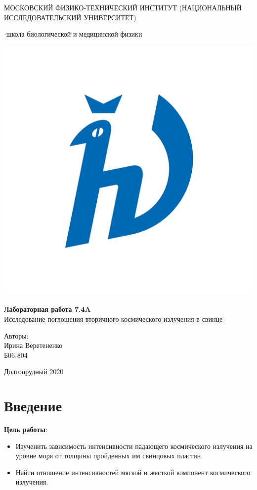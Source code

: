 \documentclass[a4paper,12pt]{article} %
\begin{document}
\begin{titlepage}
\begin{center}
    {\large МОСКОВСКИЙ ФИЗИКО-ТЕХНИЧЕСКИЙ ИНСТИТУТ (НАЦИОНАЛЬНЫЙ ИССЛЕДОВАТЕЛЬСКИЙ УНИВЕРСИТЕТ)}
\end{center}
\begin{center}
    {-школа биологической и медицинской физики}
\end{center}


    \vspace{3.5cm}

\begin{center}
    \includegraphics[width=0.4\linewidth]{hv_full.png}
\end{center}
\vspace{0.1cm}
{\huge
\begin{center}
    {\bf Лабораторная работа 7.4A}\\
    Исследование поглощения вторичного космического излучения в свинце
\end{center}
}
\vspace{2cm}
\begin{flushright}
{\LARGE Авторы:\\ Ирина Веретененко \\
\vspace{0.2cm}
Б06-804}
\end{flushright}
\vspace{3.5cm}
\begin{center}
    Долгопрудный 2020
\end{center}
\end{titlepage}

\newpage

\section{Введение}

\textbf{Цель работы}:
\begin{itemize}
    \item Изученить зависимость интенсивности падающего космического излучения на уровне моря от толщины пройденных им свинцовых пластин 
    \item Найти отношение интенсивностей мягкой и жесткой компонент космического излучения.
\end{itemize}
 
\end{document}
